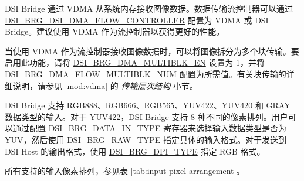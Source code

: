 \documentclass[main\_\_CN.tex]{subfiles}
\begin{document}
DSI Bridge 通过 VDMA 从系统内存接收图像数据。数据传输流控制器可以通过 \hyperref[fielddesc:DSIBRGDSIDMAFLOWCONTROLLER]{DSI\_BRG\_DSI\_DMA\_FLOW\_CONTROLLER} 配置为 VDMA 或 DSI Bridge。建议使用 VDMA 作为流控制器以获得更好的性能。




当使用 VDMA 作为流控制器接收图像数据时，可以将图像拆分为多个块传输。要启用此功能，请将 \hyperref[fielddesc:DSIBRGDMAMULTIBLKEN]{DSI\_BRG\_DMA\_MULTIBLK\_EN} 设置为 1，并将 \hyperref[fielddesc:DSIBRGDMAFLOWMULTIBLKNUM]{DSI\_BRG\_DMA\_FLOW\_MULTIBLK\_NUM} 配置为所需值。有关块传输的详细说明，请参见 \ref{mod:vdma} \textit{} 的 \textit{传输层次结构} 小节。

DSI Bridge 支持 RGB888、RGB666、RGB565、YUV422、YUV420 和 GRAY 数据类型的输入。对于 YUV422，DSI Bridge 支持 8 种不同的像素排列。用户可以通过配置 \hyperref[fielddesc:DSIBRGDATAINTYPE]{DSI\_BRG\_DATA\_IN\_TYPE} 寄存器来选择输入数据类型是否为 YUV，然后使用 \hyperref[fielddesc:DSIBRGRAWTYPE]{DSI\_BRG\_RAW\_TYPE} 指定具体的输入格式。对于发送到 DSI Host 的输出格式，使用 \hyperref[fielddesc:DSIBRGDPITYPE]{DSI\_BRG\_DPI\_TYPE} 指定 RGB 格式。

所有支持的输入像素排列，参见表 \ref{tab:input-pixel-arrangement}。
\end{document}
